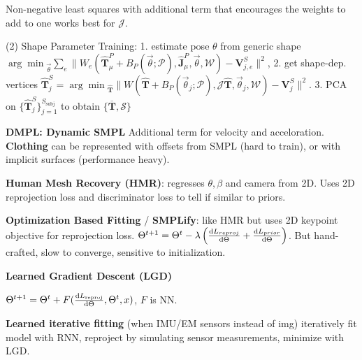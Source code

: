 Non-negative least squares with additional term that encourages the weights to add to one works best for \(\mathcal{J}\).

(2) Shape Parameter Training: 1. estimate pose \(\theta\) from generic shape \({\arg \min}_{{\vec{\theta}}} \sum_{e}\|W_{e}(\hat{\mathbf{T}}_{\mu}^{P}+B_{P}(\vec{\theta} ; \mathcal{P}), \hat{\mathbf{J}}_{\mu}^{P}, \vec{\theta}, \mathcal{W})-\mathbf{V}_{j, e}^{S}\|^{2}\),
2. get shape-dep. vertices \(\hat{\mathbf{T}}_{j}^{S}={\arg \min }_{\hat{\mathbf{T}}} \|W(\hat{\mathbf{T}}+B_{P}(\vec{\theta}_{j} ; \mathcal{P}), \mathcal{J} \hat{\mathbf{T}}, \vec{\theta}_{j}, \mathcal{W})-\mathbf{V}_{j}^{S}\|^{2}\).
3. PCA on \(\{\hat{\mathbf{T}}_{j}^{S}\}_{j=1}^{S_{\text {subj }}}\) to obtain \(\{\overline{\mathbf{T}}, \mathcal{S}\}\)

\textbf{DMPL: Dynamic SMPL} Additional term for velocity and acceloration. \textbf{Clothing} can be represented with offsets from SMPL (hard to train), or with implicit surfaces (performance heavy).

\textbf{Human Mesh Recovery (HMR)}: regresses $\theta, \beta$ and camera from 2D. Uses 2D reprojection loss and discriminator loss to tell if similar to priors.

\textbf{Optimization Based Fitting} / \textbf{SMPLify}: like HMR but uses 2D keypoint objective for reprojection loss. \(\Theta^{t+1} = \Theta^t - \lambda\left(\derivative{L_{reproj}}{\Theta} + \derivative{L_{prior}}{\Theta}\right)\). But hand-crafted, slow to converge, sensitive to initialization.

\textbf{Learned Gradient Descent (LGD)}

\(\Theta^{t+1}=\Theta^{t}+F(\derivative{L_{\text {reproj}}}{\Theta}, \Theta^{t}, x)\), \(F\) is NN.

\textbf{Learned iterative fitting} (when IMU/EM sensors instead of img) iteratively fit model with RNN, reproject by simulating sensor measurements, minimize with LGD.



